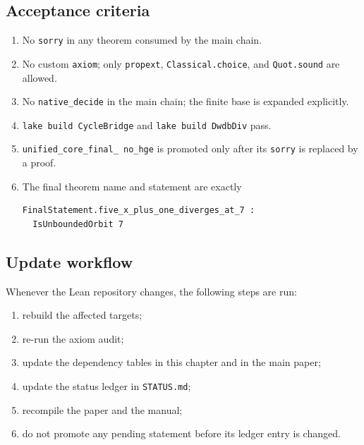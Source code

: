 \subsection{Acceptance criteria}

\begin{enumerate}[leftmargin=*]
\item No \texttt{sorry} in any theorem consumed by the main chain.
\item No custom \texttt{axiom}; only \texttt{propext},
  \texttt{Classical.choice}, and \texttt{Quot.sound} are allowed.
\item No \texttt{native\_decide} in the main chain; the finite base is
  expanded explicitly.
\item \texttt{lake build CycleBridge} and
  \texttt{lake build DwdbDiv} pass.
\item \texttt{unified\_\allowbreak core\_\allowbreak final\_\allowbreak
  no\_\allowbreak hge} is promoted only after its \texttt{sorry} is
  replaced by a proof.
\item The final theorem name and statement are exactly
  \begin{verbatim}
FinalStatement.five_x_plus_one_diverges_at_7 :
  IsUnboundedOrbit 7
  \end{verbatim}
\end{enumerate}

\subsection{Update workflow}

Whenever the Lean repository changes, the following steps are run:
\begin{enumerate}[leftmargin=*]
\item rebuild the affected targets;
\item re-run the axiom audit;
\item update the dependency tables in this chapter and in the main
  paper;
\item update the status ledger in \texttt{STATUS.md};
\item recompile the paper and the manual;
\item do not promote any pending statement before its ledger entry is
  changed.
\end{enumerate}
